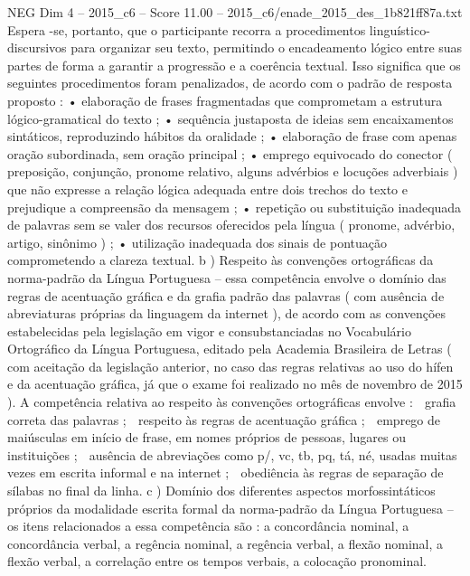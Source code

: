 \begin{textsample}{NEG Dim 4 – 2015\_c6 – Score 11.00 – 2015\_c6/enade\_2015\_des\_1b821ff87a.txt}
Espera -se, portanto, que o participante recorra a procedimentos linguístico-discursivos para organizar seu texto, permitindo o encadeamento lógico entre suas partes de forma a garantir a progressão e a coerência textual.
Isso significa que os seguintes procedimentos foram penalizados, de acordo com o padrão de resposta proposto : • elaboração de frases fragmentadas que comprometam a estrutura lógico-gramatical do texto ; • sequência justaposta de ideias sem encaixamentos sintáticos, reproduzindo hábitos da oralidade ; • elaboração de frase com apenas oração subordinada, sem oração principal ; • emprego equivocado do conector ( preposição, conjunção, pronome relativo, alguns advérbios e locuções adverbiais ) que não expresse a relação lógica adequada entre dois trechos do texto e prejudique a compreensão da mensagem ; • repetição ou substituição inadequada de palavras sem se valer dos recursos oferecidos pela língua ( pronome, advérbio, artigo, sinônimo ) ; • utilização inadequada dos sinais de pontuação comprometendo a clareza textual. b ) Respeito às convenções ortográficas da norma-padrão da Língua Portuguesa – essa competência envolve o domínio das regras de acentuação gráfica e da grafia padrão das palavras ( com ausência de abreviaturas próprias da linguagem da internet ), de acordo com as convenções estabelecidas pela legislação em vigor e consubstanciadas no Vocabulário Ortográfico da Língua Portuguesa, editado pela Academia Brasileira de Letras ( com aceitação da legislação anterior, no caso das regras relativas ao uso do hífen e da acentuação gráfica, já que o exame foi realizado no mês de novembro de 2015 ).
A competência relativa ao respeito às convenções ortográficas envolve :  grafia correta das palavras ;  respeito às regras de acentuação gráfica ;  emprego de maiúsculas em início de frase, em nomes próprios de pessoas, lugares ou instituições ;  ausência de abreviações como p/, vc, tb, pq, tá, né, usadas muitas vezes em escrita informal e na internet ;  obediência às regras de separação de sílabas no final da linha. c ) Domínio dos diferentes aspectos morfossintáticos próprios da modalidade escrita formal da norma-padrão da Língua Portuguesa – os itens relacionados a essa competência são : a concordância nominal, a concordância verbal, a regência nominal, a regência verbal, a flexão nominal, a flexão verbal, a correlação entre os tempos verbais, a colocação pronominal.

\end{textsample}
